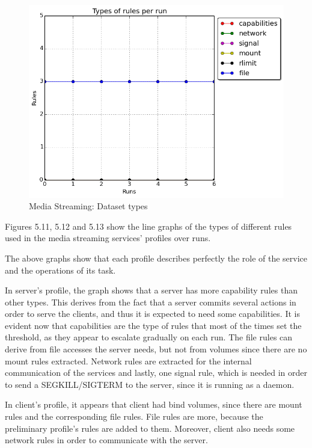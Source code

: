 \hfill\break\hfill\break\hfill\break\hfill\break\hfill\break\hfill\break\hfill\break\hfill\break\hfill\break\hfill\break\hfill\break\hfill\break\hfill\break\hfill\break\hfill\break\hfill\break\hfill\break

\begin{figure}[h!]
  \centering
   \includegraphics[width=0.7\linewidth]{./figures/mediastreaming/types_cloudsuitemedia-streamingdataset.png}
   \caption{Media Streaming: Dataset types}
\end{figure}

Figures 5.11, 5.12 and 5.13 show the line graphs of the types of different rules used in the media streaming services' profiles over runs. 

The above graphs show that each profile describes perfectly the role of the service and the operations of its task.

In server's profile, the graph shows that a server has more capability rules than other types. This derives from the fact that a server commits several actions in order to serve the clients, and thus it is expected to need some capabilities. It is evident now that capabilities are the type of rules that most of the times set the threshold, as they appear to escalate gradually on each run. The file rules can derive from file accesses the server needs, but not from volumes since there are no mount rules extracted. Network rules are extracted for the internal communication of the services and lastly, one signal rule, which is needed in order to send a SEGKILL/SIGTERM to the server, since it is running as a daemon.

In client's profile, it appears that client had bind volumes, since there are mount rules and the corresponding file rules. File rules are more, because the preliminary profile's rules are added to them. Moreover, client also needs some network rules in order to communicate with the server.

